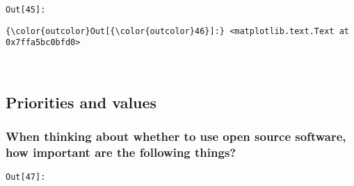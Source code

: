 \documentclass[11pt]{article}
\begin{document}
\texttt{\color{outcolor}Out[{\color{outcolor}45}]:}
    

    


            \begin{Verbatim}[commandchars=\\\{\}]
{\color{outcolor}Out[{\color{outcolor}46}]:} <matplotlib.text.Text at 0x7ffa5bc0bfd0>
\end{Verbatim}
        
    \begin{center}
    \end{center}
    { \hspace*{\fill} \\}
    
    \subsection{Priorities and values}\label{priorities-and-values}

    \subsubsection{When thinking about whether to use open source software,
how important are the following
things?}\label{when-thinking-about-whether-to-use-open-source-software-how-important-are-the-following-things}

\texttt{\color{outcolor}Out[{\color{outcolor}47}]:}
    
\end{document}
